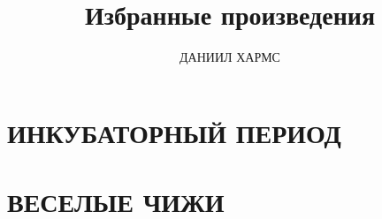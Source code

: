 \documentclass[12pt]{book}
\begin{document}
\title{Избранные произведения}
\author{ДАНИИЛ ХАРМС}
\date{}
\maketitle





\chapter{ИНКУБАТОРНЫЙ ПЕРИОД}





\chapter{ВЕСЕЛЫЕ ЧИЖИ}

\end{document}
